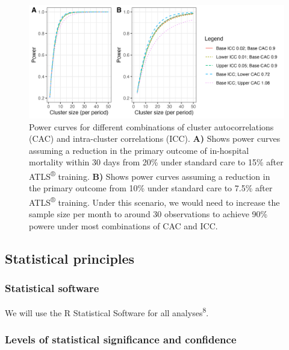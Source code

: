 \documentclass[
]{scrartcl}
\begin{document}
\begin{figure}

{\centering \includegraphics{./combined-power-curves.png}

}

\caption{\label{fig-power-curves}Power curves for different combinations
of cluster autocorrelations (CAC) and intra-cluster correlations (ICC).
\textbf{A)} Shows power curves assuming a reduction in the primary
outcome of in-hospital mortality within 30 days from 20\% under standard
care to 15\% after ATLS\textsuperscript{®} training. \textbf{B)} Shows
power curves assuming a reduction in the primary outcome from 10\% under
standard care to 7.5\% after ATLS\textsuperscript{®} training. Under
this scenario, we would need to increase the sample size per month to
around 30 observations to achieve 90\% powere under most combinations of
CAC and ICC.}

\end{figure}

\hypertarget{statistical-principles}{%
\subsection{Statistical principles}\label{statistical-principles}}

\hypertarget{statistical-software}{%
\subsubsection{Statistical software}\label{statistical-software}}

We will use the R Statistical Software for all
analyses\textsuperscript{8}.

\hypertarget{levels-of-statistical-significance-and-confidence}{%
\subsubsection{Levels of statistical significance and
confidence}\label{levels-of-statistical-significance-and-confidence}}
\end{document}
